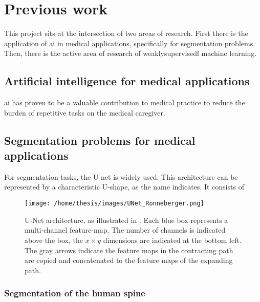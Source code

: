 \chapter{Previous work}

This project sits at the intersection of two areas of research. 
First there is the application of \Gls{ai} in medical applications, specifically for segmentation problems.
Then, there is the active area of research of \Gls{weaklysupervisedl} machine learning.

\section{Artificial intelligence for medical applications}


\Gls{ai} has proven to be a valuable contribution to medical practice to reduce the burden of repetitive tasks on the medical caregiver.


\section{Segmentation problems for medical applications}


For segmentation tasks, the U-net \cite{Ronneberger2015} is widely used. 
This architecture can be represented by a characteristic U-shape, as the name indicates.
It consists of 

\begin{SCfigure}[][htb]
    \texttt{[image: /home/thesis/images/UNet\_Ronneberger.png]}
    \caption{U-Net architecture, as illustrated in \cite{Ronneberger2015}. 
    Each blue box represents a multi-channel feature-map. 
    The number of channels is indicated above the box, the $x \times y$ dimensions are indicated at the bottom left.
    The gray arrows indicate the feature maps in the contracting path are copied and concatenated to the feature maps of the expanding path.}
    \label{fig:unet}
\end{SCfigure}


\subsection{Segmentation of the human spine}

